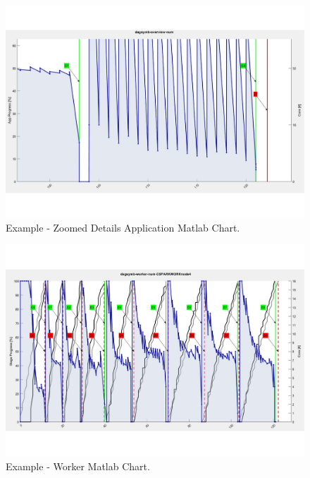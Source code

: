 \begin{figure}[thbp]
	\centering
	\includegraphics[width=\columnwidth]{images/plot_app_zoom.pdf}
	\caption{Example - Zoomed Details Application Matlab Chart.}
	\label{fig:plot_app_zoom}
\end{figure}
\begin{figure}[thbp]
	\centering
	\includegraphics[width=\columnwidth]{images/plot_worker.pdf}
	\caption{Example - Worker Matlab Chart.}
	\label{fig:plot_worker}
\end{figure}
